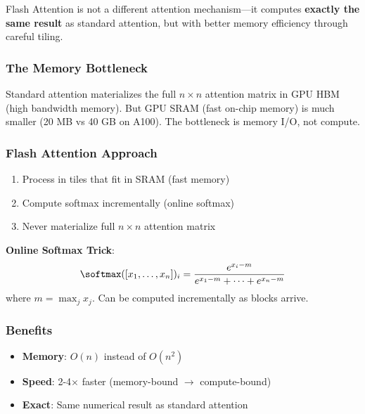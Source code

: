 \begin{keyinsight}
Flash Attention is not a different attention mechanism---it computes \textbf{exactly the same result} as standard attention, but with better memory efficiency through careful tiling.
\end{keyinsight}

\subsubsection{The Memory Bottleneck}

Standard attention materializes the full $n \times n$ attention matrix in GPU HBM (high bandwidth memory). But GPU SRAM (fast on-chip memory) is much smaller (20 MB vs 40 GB on A100). The bottleneck is memory I/O, not compute.

\subsubsection{Flash Attention Approach}

\begin{enumerate}
    \item Process in tiles that fit in SRAM (fast memory)
    \item Compute softmax incrementally (online softmax)
    \item Never materialize full $n \times n$ attention matrix
\end{enumerate}

\textbf{Online Softmax Trick}:
\begin{equation}
\softmax([x_1, \ldots, x_n])_i = \frac{e^{x_i - m}}{e^{x_1 - m} + \cdots + e^{x_n - m}}
\end{equation}
where $m = \max_j x_j$. Can be computed incrementally as blocks arrive.

\subsubsection{Benefits}

\begin{itemize}
    \item \textbf{Memory}: $O(n)$ instead of $O(n^2)$
    \item \textbf{Speed}: 2-4$\times$ faster (memory-bound $\to$ compute-bound)
    \item \textbf{Exact}: Same numerical result as standard attention
\end{itemize}

